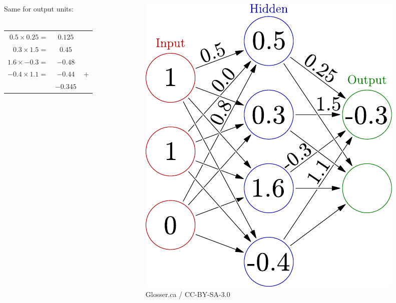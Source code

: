 \documentclass[mathserif]{beamer}
\begin{document}
\begin{frame}
\begin{columns}[T]
\begin{column}{.5\textwidth}
Same for output units: \\
\ \\
\begin{tabular}{r S[tabformat=3.2] r}%
 $0.5 \times 0.25 =$ & $0.125$ &\\
 $0.3 \times 1.5  =$ & $0.45$ &\\
 $1.6 \times -0.3 =$ & $-0.48$ &\\
 $-0.4 \times 1.1 =$ & $-0.44$ & + \\
 \hline
 & $-0.345$ & 
\end{tabular}
    \end{column}
    \begin{column}{.5\textwidth}
\begin{figure}
 \centering
 \includegraphics[width=\linewidth]{./fig/3-layer_propagate.pdf}
  \caption{Glosser.ca / CC-BY-SA-3.0}
\end{figure}
    \end{column}
  \end{columns}
\end{frame}
\end{document}
